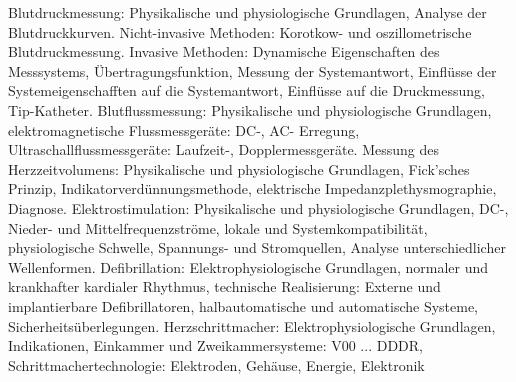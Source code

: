 \begin{course}
\begin{content}
Blutdruckmessung: Physikalische und physiologische Grundlagen, Analyse der Blutdruckkurven. Nicht-invasive Methoden: Korotkow- und oszillometrische Blutdruckmessung. Invasive Methoden: Dynamische Eigenschaften des Messsystems, Übertragungsfunktion, Messung der Systemantwort, Einflüsse der Systemeigenschafften auf die Systemantwort, Einflüsse auf die Druckmessung, Tip-Katheter.\newline
\newline
 Blutflussmessung: Physikalische und physiologische Grundlagen, elektromagnetische Flussmessgeräte: DC-, AC- Erregung, Ultraschallflussmessgeräte: Laufzeit-, Dopplermessgeräte.\newline
\newline
 Messung des Herzzeitvolumens: Physikalische und physiologische Grundlagen, Fick'sches Prinzip, Indikatorverdünnungsmethode, elektrische Impedanzplethysmographie, Diagnose.\newline
\newline
 Elektrostimulation: Physikalische und physiologische Grundlagen, DC-, Nieder- und Mittelfrequenzströme, lokale und Systemkompatibilität, physiologische Schwelle, Spannungs- und Stromquellen, Analyse unterschiedlicher Wellenformen.\newline
\newline
 Defibrillation: Elektrophysiologische Grundlagen, normaler und krankhafter kardialer Rhythmus, technische Realisierung: Externe und implantierbare Defibrillatoren, halbautomatische und automatische Systeme, Sicherheitsüberlegungen.\newline
\newline
 Herzschrittmacher: Elektrophysiologische Grundlagen, Indikationen, Einkammer und Zweikammersysteme: V00 ... DDDR, Schrittmachertechnologie: Elektroden, Gehäuse, Energie, Elektronik


\end{content}







\end{course}